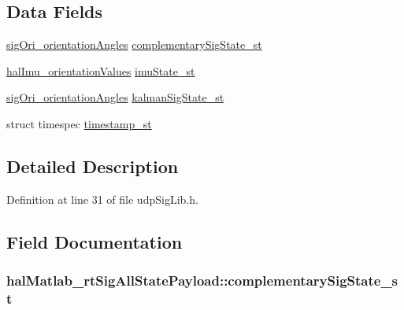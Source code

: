 \subsection*{Data Fields}
\begin{DoxyCompactItemize}
\item 
\hyperlink{structsigOri__orientationAngles}{sig\+Ori\+\_\+orientation\+Angles} \hyperlink{structhalMatlab__rtSigAllStatePayload_ae2a362e5944039d976077bb43797fd30_ae2a362e5944039d976077bb43797fd30}{complementary\+Sig\+State\+\_\+st}
\item 
\hyperlink{structhalImu__orientationValues}{hal\+Imu\+\_\+orientation\+Values} \hyperlink{structhalMatlab__rtSigAllStatePayload_a077a67bc0c0d249d0e4bfb7287676646_a077a67bc0c0d249d0e4bfb7287676646}{imu\+State\+\_\+st}
\item 
\hyperlink{structsigOri__orientationAngles}{sig\+Ori\+\_\+orientation\+Angles} \hyperlink{structhalMatlab__rtSigAllStatePayload_a125a952adeb10a6d7391f2b0acfcaae2_a125a952adeb10a6d7391f2b0acfcaae2}{kalman\+Sig\+State\+\_\+st}
\item 
struct timespec \hyperlink{structhalMatlab__rtSigAllStatePayload_a2526e3f137ca373500385c769c69b897_a2526e3f137ca373500385c769c69b897}{timestamp\+\_\+st}
\end{DoxyCompactItemize}


\subsection{Detailed Description}


Definition at line 31 of file udp\+Sig\+Lib.\+h.



\subsection{Field Documentation}
\hypertarget{structhalMatlab__rtSigAllStatePayload_ae2a362e5944039d976077bb43797fd30_ae2a362e5944039d976077bb43797fd30}{
\subsubsection[{complementary\+Sig\+State\+\_\+st}]{ hal\+Matlab\+\_\+rt\+Sig\+All\+State\+Payload\+::complementary\+Sig\+State\+\_\+st}}\label{structhalMatlab__rtSigAllStatePayload_ae2a362e5944039d976077bb43797fd30_ae2a362e5944039d976077bb43797fd30}



